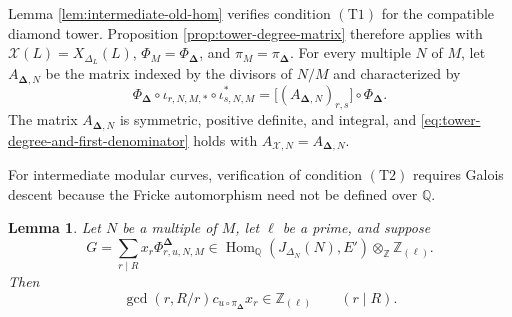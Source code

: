 \documentclass[12pt, letterpaper]{amsart}
\newtheorem{lemma}[theorem]{Lemma}
\theoremstyle{definition}
\theoremstyle{remark}
\newcommand{\Q}{\mathbb Q}
\newcommand{\Z}{\mathbb Z}
\newcommand{\Hom}{\operatorname{Hom}}
\numberwithin{equation}{section}
\begin{document}
Lemma \ref{lem:intermediate-old-hom} verifies condition
\hyperlink{tower-condition-T1}{\(\mathrm{(T1)}\)} for the compatible diamond tower. Proposition
\ref{prop:tower-degree-matrix} therefore applies with
\(\mathcal X(L)=X_{\Delta_L}(L)\),
\(\Phi_M=\Phi_{\boldsymbol\Delta}\), and
\(\pi_M=\pi_{\boldsymbol\Delta}\). For every multiple \(N\) of \(M\), let
\(A_{\boldsymbol\Delta,N}\) be the matrix indexed by the divisors of \(N/M\)
and characterized by
\begin{equation}\label{eq:intermediate-degree-matrix}
        \Phi_{\boldsymbol\Delta}\circ
        \iota_{r,N,M,*}\circ
        \iota_{s,N,M}^*
        =
        \bigl[(A_{\boldsymbol\Delta,N})_{r,s}\bigr]\circ\Phi_{\boldsymbol\Delta}.
\end{equation}
The matrix \(A_{\boldsymbol\Delta,N}\) is symmetric, positive definite, and
integral, and
\eqref{eq:tower-degree-and-first-denominator} holds with
\(A_{\mathcal X,N}=A_{\boldsymbol\Delta,N}\).

For intermediate modular curves, verification of condition
\hyperlink{tower-condition-T2}{\(\mathrm{(T2)}\)} requires Galois descent because the Fricke automorphism need
not be defined over \(\Q\).

\begin{lemma}\label{lem:intermediate-two-cusp}
Let \(N\) be a multiple of \(M\), let \(\ell\) be a prime, and suppose
\[
        G=\sum_{r\mid R}x_r\Phi^{\boldsymbol\Delta}_{r,u,N,M}
        \in\Hom_\Q(J_{\Delta_N}(N),E')\otimes_\Z\Z_{(\ell)}.
\]
Then
\begin{equation}\label{eq:intermediate-two-cusp}
        \gcd(r,R/r)c_{u\circ\pi_{\boldsymbol\Delta}}x_r\in\Z_{(\ell)}
        \qquad(r\mid R).
\end{equation}
\end{lemma}
\end{document}
